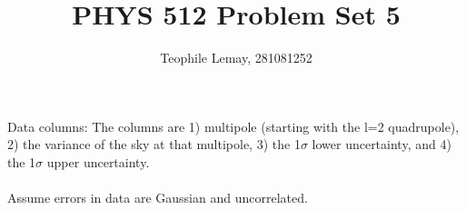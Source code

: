 \documentclass{article}
\title{PHYS 512 Problem Set 5}
\author{Teophile Lemay, 281081252}
\date{}
\newcommand{\<}[1]{\left\langle #1 \right\rangle }
\begin{document}
\maketitle

\section{}
Data columns: The columns are 1) multipole
(starting with the l=2 quadrupole), 2) the variance of the sky at that multipole, 3) the 1$\sigma$ lower uncertainty, and 4) the 1$\sigma$ upper uncertainty.\\
\\
Assume errors in data are Gaussian and uncorrelated.


	
\end{document}
